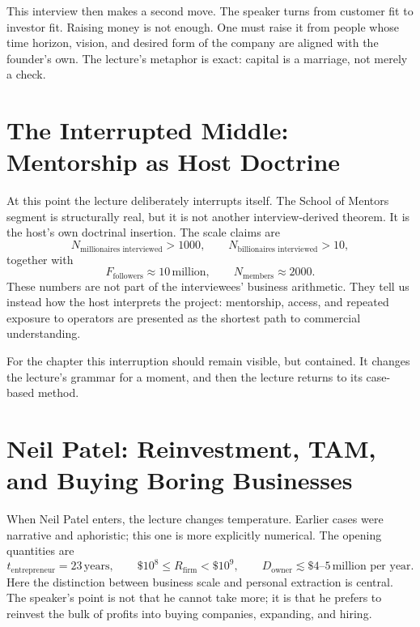 This interview then makes a second move. The speaker turns from customer fit to investor fit. Raising money is not enough. One must raise it from people whose time horizon, vision, and desired form of the company are aligned with the founder's own. The lecture's metaphor is exact: capital is a marriage, not merely a check.

\section{The Interrupted Middle: Mentorship as Host Doctrine}

At this point the lecture deliberately interrupts itself. The School of Mentors segment is structurally real, but it is not another interview-derived theorem. It is the host's own doctrinal insertion. The scale claims are
\begin{equation}
N_{\text{millionaires interviewed}} > 1000, \qquad N_{\text{billionaires interviewed}} > 10,
\end{equation}
together with
\begin{equation}
F_{\text{followers}} \approx 10\,\text{million}, \qquad N_{\text{members}} \approx 2000.
\end{equation}
These numbers are not part of the interviewees' business arithmetic. They tell us instead how the host interprets the project: mentorship, access, and repeated exposure to operators are presented as the shortest path to commercial understanding.

For the chapter this interruption should remain visible, but contained. It changes the lecture's grammar for a moment, and then the lecture returns to its case-based method.

\section{Neil Patel: Reinvestment, TAM, and Buying Boring Businesses}

When Neil Patel enters, the lecture changes temperature. Earlier cases were narrative and aphoristic; this one is more explicitly numerical. The opening quantities are
\begin{equation}
t_{\text{entrepreneur}} = 23\,\text{years}, \qquad
\$10^8 \le R_{\text{firm}} < \$10^9, \qquad
D_{\text{owner}} \lesssim \$4\text{--}5\,\text{million per year}.
\end{equation}
Here the distinction between business scale and personal extraction is central. The speaker's point is not that he cannot take more; it is that he prefers to reinvest the bulk of profits into buying companies, expanding, and hiring.

